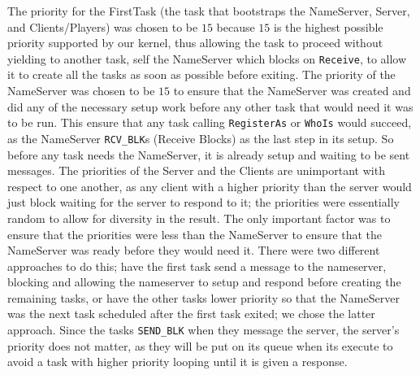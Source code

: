 \documentclass[12pt]{article}
\begin{document}
The priority for the FirstTask (the task that bootstraps the NameServer, Server, and Clients/Players) was chosen to be $15$ because $15$ is the highest possible priority supported by our kernel, thus allowing the task to proceed without yielding to another task, self the NameServer which blocks on \texttt{Receive}, to allow it to create all the tasks as soon as possible before exiting.  The priority of the NameServer was chosen to be $15$ to ensure that the NameServer was created and did any of the necessary setup work before any other task that would need it was to be run.  This ensure that any task calling \texttt{RegisterAs} or \texttt{WhoIs} would succeed, as the NameServer \texttt{RCV\_BLK}s (Receive Blocks) as the last step in its setup.  So before any task needs the NameServer, it is already setup and waiting to be sent messages.  The priorities of the Server and the Clients are unimportant with respect to one another, as any client with a higher priority than the server would just block waiting for the server to respond to it; the priorities were essentially random to allow for diversity in the result.  The only important factor was to ensure that the priorities were less than the NameServer to ensure that the NameServer was ready before they would need it.  There were two different approaches to do this; have the first task send a message to the nameserver, blocking and allowing the nameserver to setup and respond before creating the remaining tasks, or have the other tasks lower priority so that the NameServer was the next task scheduled after the first task exited; we chose the latter approach.  Since the tasks \texttt{SEND\_BLK} when they message the server, the server's priority does not matter, as they will be put on its queue when its execute to avoid a task with higher priority looping until it is given a response.
\\[1\baselineskip]
\end{document}
